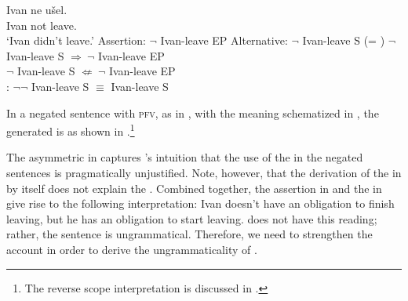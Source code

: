 \documentclass[output=paper,newtxmath,colorlinks,citecolor=brown]{langsci/langscibook}
\begin{document}
\ea \ea \gll Ivan ne u\v sel. \\
	Ivan not {leave.\p} \\
    \glt `Ivan didn't leave.' \label{simplepfv}
    \ex Assertion: $\neg$ Ivan-leave EP \label{assertpfv}
    \ex Alternative: $\neg$ Ivan-leave S \hfill (= ) \label{altpfv}
    \ex {}  $\neg$ Ivan-leave S $\Rightarrow\ \neg$ Ivan-leave EP \\
    {} $\neg$ Ivan-leave S $\not\Leftarrow\ \neg$ Ivan-leave EP  \label{ent} \\
    \ex {}: $\neg \neg$ Ivan-leave S $\equiv$ Ivan-leave S \label{derivesipfv}
    \z \z

 \noindent In a negated  sentence with \textsc{pfv}, as in , with the meaning schematized in , the generated  is as shown in .\footnote{The reverse scope interpretation is discussed in .
 }


\ea {}
	\z \z

\noindent The asymmetric  in  captures \citeauthor{rap85}'s intuition that the use of the  in the negated  sentences is pragmatically unjustified. Note, however, that the derivation of the  in  by itself does not explain the . Combined together, the assertion in  and the  in  give rise to the following interpretation: Ivan doesn't have an obligation to finish leaving, but he has an obligation to start leaving.  does not have this reading; rather, the sentence is ungrammatical. Therefore, we need to strengthen the account in order to derive the ungrammaticality of .
\end{document}

